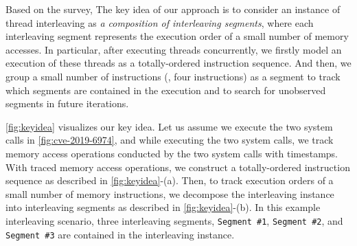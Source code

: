 %
\begin{figure}[t]
  \hfill
  \caption{}
  \label{fig:keyidea}
\end{figure}
%
Based on the survey, The key idea of our approach is to consider an
instance of thread interleaving as \textit{a composition of
  interleaving segments}, where each interleaving segment represents
the execution order of a small number of memory accesses.
%
In particular, after executing threads concurrently, we firstly model
an execution of these threads as a totally-ordered instruction
sequence.
%
And then, we group a small number of instructions (\eg, four
instructions) as a segment to track which segments are contained in
the execution and to search for unobserved segments in future
iterations.


\autoref{fig:keyidea} visualizes our key idea.
%
Let us assume we execute the two system calls in
\autoref{fig:cve-2019-6974}, and while executing the two system calls,
we track memory access operations conducted by the two system calls
with timestamps.
%
With traced memory access operations, we construct a totally-ordered
instruction sequence as described in \autoref{fig:keyidea}-(a).
%
Then, to track execution orders of a small number of memory
instructions, we decompose the interleaving instance into interleaving
segments as described in \autoref{fig:keyidea}-(b).
%
In this example interleaving scenario, three interleaving segments,
\texttt{Segment \#1}, \texttt{Segment \#2}, and \texttt{Segment \#3}
are contained in the interleaving instance.

